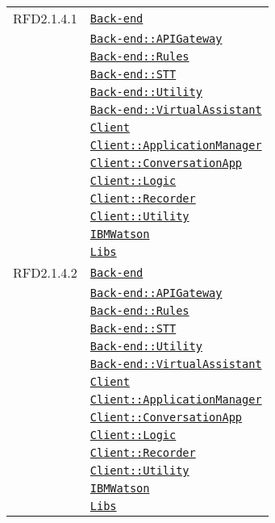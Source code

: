 \begin{longtable}{|>{\centering}m{3cm}|m{10cm}<{\centering}|}
RFD2.1.4.1 & \hyperref[Back-end]{\texttt{Back-end}}\\
& \hyperref[Back-end::APIGateway]{\texttt{Back-end::APIGateway}}\\
& \hyperref[Back-end::Rules]{\texttt{Back-end::Rules}}\\
& \hyperref[Back-end::STT]{\texttt{Back-end::STT}}\\
& \hyperref[Back-end::Utility]{\texttt{Back-end::Utility}}\\
& \hyperref[Back-end::VirtualAssistant]{\texttt{Back-end::VirtualAssistant}}\\
& \hyperref[Client]{\texttt{Client}}\\
& \hyperref[Client::ApplicationManager]{\texttt{Client::ApplicationManager}}\\
& \hyperref[Client::ConversationApp]{\texttt{Client::ConversationApp}}\\
& \hyperref[Client::Logic]{\texttt{Client::Logic}}\\
& \hyperref[Client::Recorder]{\texttt{Client::Recorder}}\\
& \hyperref[Client::Utility]{\texttt{Client::Utility}}\\
& \hyperref[IBMWatson]{\texttt{IBMWatson}}\\
& \hyperref[Libs]{\texttt{Libs}}\\ \hline

RFD2.1.4.2 & \hyperref[Back-end]{\texttt{Back-end}}\\
& \hyperref[Back-end::APIGateway]{\texttt{Back-end::APIGateway}}\\
& \hyperref[Back-end::Rules]{\texttt{Back-end::Rules}}\\
& \hyperref[Back-end::STT]{\texttt{Back-end::STT}}\\
& \hyperref[Back-end::Utility]{\texttt{Back-end::Utility}}\\
& \hyperref[Back-end::VirtualAssistant]{\texttt{Back-end::VirtualAssistant}}\\
& \hyperref[Client]{\texttt{Client}}\\
& \hyperref[Client::ApplicationManager]{\texttt{Client::ApplicationManager}}\\
& \hyperref[Client::ConversationApp]{\texttt{Client::ConversationApp}}\\
& \hyperref[Client::Logic]{\texttt{Client::Logic}}\\
& \hyperref[Client::Recorder]{\texttt{Client::Recorder}}\\
& \hyperref[Client::Utility]{\texttt{Client::Utility}}\\
& \hyperref[IBMWatson]{\texttt{IBMWatson}}\\
& \hyperref[Libs]{\texttt{Libs}}\\ \hline


\end{longtable}
